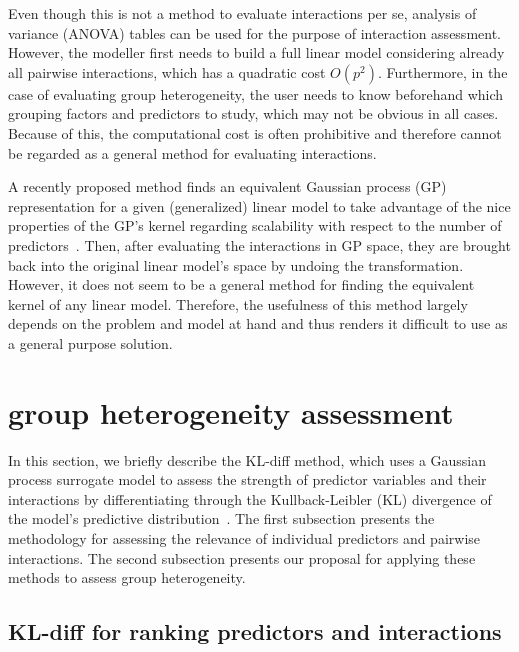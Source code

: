 \documentclass{article}
\begin{document}
Even though this is not a method to evaluate interactions per se, analysis of variance (ANOVA) tables can be used for the purpose of interaction assessment.
However, the modeller first needs to build a full linear model considering already all pairwise interactions, which has a quadratic cost $O(p^2)$. 
Furthermore, in the case of evaluating group heterogeneity, the user needs to know beforehand which grouping factors and predictors to study, which may not be obvious in all cases. 
Because of this, the computational cost is often prohibitive and therefore cannot be regarded as a general method for evaluating interactions.


A recently proposed method finds an equivalent Gaussian process (GP) representation for a given (generalized) linear model to take advantage of the nice properties of the GP's kernel regarding scalability with respect to the number of predictors~\cite{agrawal2019kernel}.
%
Then, after evaluating the interactions in GP space, they are brought back into the original linear model's space by undoing the transformation.
However, it does not seem to be a general method for finding the equivalent kernel of any linear model. 
Therefore, the usefulness of this method largely depends on the problem and model at hand and thus renders it difficult to use as a general purpose solution.



 

%
%
%
%
%
%
%
%
%
%

%
%
%
%
%
%
%
%
%
%
%
%
%

%
\section{group heterogeneity assessment}
\label{sec:kldiff}

In this section, we briefly describe the KL-diff method, which uses a Gaussian process
surrogate model to assess the strength of predictor variables and their interactions by differentiating
through the Kullback-Leibler (KL) divergence of the model's
predictive distribution~\cite{paananen2019ranking}. 
%
%
%
The first subsection presents the methodology for assessing the relevance of individual predictors and pairwise interactions.
The second subsection presents our proposal for applying these methods to assess group heterogeneity.


\subsection{KL-diff for ranking predictors and interactions}
\end{document}
